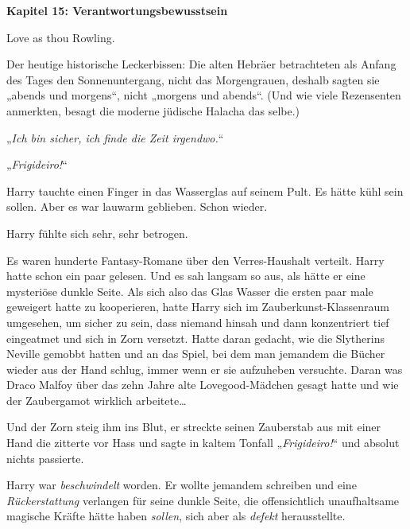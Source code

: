 

\hypertarget{verantwortungsbewusstsein}{%

\textbf{Kapitel 15: Verantwortungsbewusstsein}

Love as thou Rowling.

Der heutige historische Leckerbissen: Die alten Hebräer betrachteten als Anfang des Tages den Sonnenuntergang, nicht das Morgengrauen, deshalb sagten sie „abends und morgens“, nicht „morgens und abends“. (Und wie viele Rezensenten anmerkten, besagt die moderne jüdische Halacha das selbe.)

\later

„\emph{Ich bin sicher, ich finde die Zeit irgendwo.}“

\later

„\emph{Frigideiro!}“

Harry tauchte einen Finger in das Wasserglas auf seinem Pult. Es hätte kühl sein sollen. Aber es war lauwarm geblieben. Schon wieder.

Harry fühlte sich sehr, sehr betrogen.

Es waren hunderte Fantasy-Romane über den Verres-Haushalt verteilt. Harry hatte schon ein paar gelesen. Und es sah langsam so aus, als hätte er eine mysteriöse dunkle Seite. Als sich also das Glas Wasser die ersten paar male geweigert hatte zu kooperieren, hatte Harry sich im Zauberkunst-Klassenraum umgesehen, um sicher zu sein, dass niemand hinsah und dann konzentriert tief eingeatmet und sich in Zorn versetzt. Hatte daran gedacht, wie die Slytherins Neville gemobbt hatten und an das Spiel, bei dem man jemandem die Bücher wieder aus der Hand schlug, immer wenn er sie aufzuheben versuchte. Daran was Draco Malfoy über das zehn Jahre alte Lovegood-Mädchen gesagt hatte und wie der Zaubergamot wirklich arbeitete…

Und der Zorn steig ihm ins Blut, er streckte seinen Zauberstab aus mit einer Hand die zitterte vor Hass und sagte in kaltem Tonfall „\emph{Frigideiro!}“ und absolut nichts passierte.

Harry war \emph{beschwindelt} worden. Er wollte jemandem schreiben und eine \emph{Rückerstattung} verlangen für seine dunkle Seite, die offensichtlich unaufhaltsame magische Kräfte hätte haben \emph{sollen}, sich aber als \emph{defekt} herausstellte.

}
